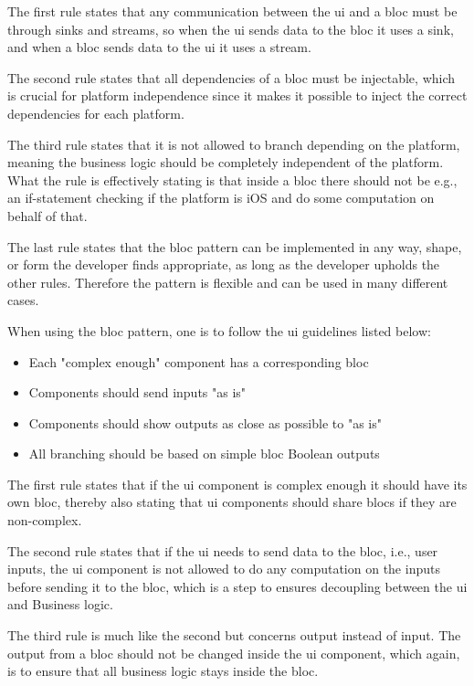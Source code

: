 The first rule states that any communication between the \gls{ui} and a \gls{bloc} must be through sinks and streams, so when the \gls{ui} sends data to the \gls{bloc} it uses a sink, and when a \gls{bloc} sends data to the \gls{ui} it uses a stream.

The second rule states that all dependencies of a \gls{bloc} must be injectable, which is crucial for platform independence since it makes it possible to inject the correct dependencies for each platform.

The third rule states that it is not allowed to branch depending on the platform, meaning the business logic should be completely independent of the platform. What the rule is effectively stating is that inside a \gls{bloc} there should not be e.g., an if-statement checking if the platform is iOS and do some computation on behalf of that.

The last rule states that the \gls{bloc} pattern can be implemented in any way, shape, or form the developer finds appropriate, as long as the developer upholds the other rules. Therefore the pattern is flexible and can be used in many different cases.

When using the \gls{bloc} pattern, one is to follow the \gls{ui} guidelines listed below:

\begin{itemize}
  \item Each "complex enough" component has a corresponding \gls{bloc}
  \item Components should send inputs "as is"
  \item Components should show outputs as close as possible to "as is"
  \item All branching should be based on simple \gls{bloc} Boolean outputs
\end{itemize}

The first rule states that if the \gls{ui} component is complex enough it should have its own \gls{bloc}, thereby also stating that \gls{ui} components should share \glspl{bloc} if they are non-complex.

The second rule states that if the \gls{ui} needs to send data to the \gls{bloc}, i.e., user inputs, the \gls{ui} component is not allowed to do any computation on the inputs before sending it to the \gls{bloc}, which is a step to ensures decoupling between the \gls{ui} and Business logic.

The third rule is much like the second but concerns output instead of input. The output from a \gls{bloc} should not be changed inside the \gls{ui} component, which again, is to ensure that all business logic stays inside the \gls{bloc}.

